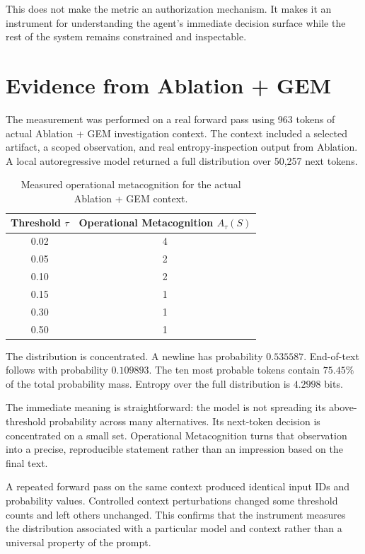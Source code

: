 \documentclass[11pt,a4paper]{article}
\begin{document}
This does not make the metric an authorization mechanism. It makes it an instrument for understanding the agent's immediate decision surface while the rest of the system remains constrained and inspectable.

\section{Evidence from Ablation + GEM}
The measurement was performed on a real forward pass using 963 tokens of actual Ablation + GEM investigation context. The context included a selected artifact, a scoped observation, and real entropy-inspection output from Ablation. A local autoregressive model returned a full distribution over 50,257 next tokens.

\begin{table}[h]
\centering
\caption{Measured operational metacognition for the actual Ablation + GEM context.}
\label{tab:result}
\begin{tabular}{cc}
\toprule
Threshold $\tau$ & Operational Metacognition $A_\tau(S)$ \\
\midrule
0.02 & 4 \\
0.05 & 2 \\
0.10 & 2 \\
0.15 & 1 \\
0.30 & 1 \\
0.50 & 1 \\
\bottomrule
\end{tabular}
\end{table}

The distribution is concentrated. A newline has probability $0.535587$. End-of-text follows with probability $0.109893$. The ten most probable tokens contain $75.45\%$ of the total probability mass. Entropy over the full distribution is $4.2998$ bits.

The immediate meaning is straightforward: the model is not spreading its above-threshold probability across many alternatives. Its next-token decision is concentrated on a small set. Operational Metacognition turns that observation into a precise, reproducible statement rather than an impression based on the final text.

A repeated forward pass on the same context produced identical input IDs and probability values. Controlled context perturbations changed some threshold counts and left others unchanged. This confirms that the instrument measures the distribution associated with a particular model and context rather than a universal property of the prompt.
\end{document}
